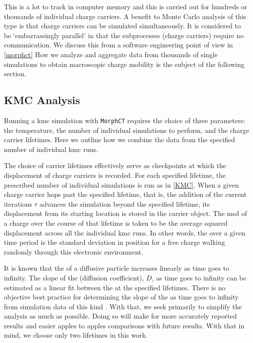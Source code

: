 This is a lot to track in computer memory and this is carried out for hundreds
or thousands of individual charge carriers. 
A benefit to Monte Carlo analysis of this type is that charge carriers can be
simulated simultaneously. It is considered
to be `embarrassingly parallel' in that the subprocesses (charge carriers) require no communication.
We discuss this from a software engineering point of view in \autoref{morphct}
How we analyze and aggregate data from thousands of
single  simulations to obtain macroscopic charge mobility is the subject of the following section.

\subsection{KMC Analysis}

\label{kmcanalysis}


Running a \gls{kmc} simulation with \texttt{MorphCT} requires the choice of three parameters: the
 temperature, the number of individual 
simulations to perform, and the charge carrier lifetimes. Here we outline how
we combine the data from the specified number of individual \gls{kmc} runs.  

The choice of carrier lifetimes effectively serve as checkpoints at which the displacement of charge carriers is recorded. For
each specified lifetime, the prescribed number of individual  simulations is run as in \autoref{KMC}. When a
given charge carrier hops past the specified lifetime, that is, the addition of the current iterations 
$\tau$ advances the simulation beyond the specified lifetime, 
its displacement from its starting location is stored in the carrier object. 
The \gls{msd} of a charge over the course of that lifetime is taken to be the
average squared displacement across all the individual \gls{kmc} runs. 
In other words, the  over a given time period is 
the standard deviation in position for a free charge walking randomly through this electronic environment. 

It is known that the  of a diffusive particle increases linearly as time goes to infinity. 
The slope of the  (diffusion coefficient), $D$, as time
goes to infinity can be estimated as a linear fit between the  at the specified lifetimes.
There is no objective best practice for determining the slope of the  as
time goes to infinity from simulation data of this kind \cite{Maginn2018}. With that, we seek primarily to
simplify the  analysis as much as possible. Doing so will make for more accurately reported results and
easier apples to apples comparisons with future results. With that in mind, we choose only two lifetimes in
this work.

